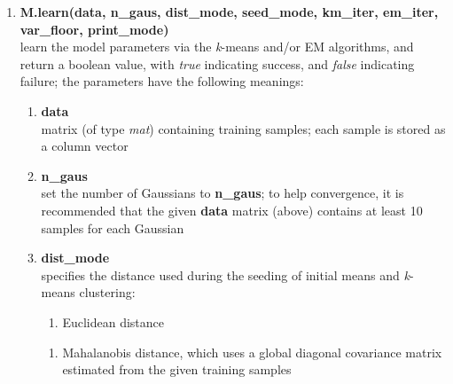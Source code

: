 \vspace{6ex}
\begin{enumerate}[{$\bullet$}]
\itemsep 1ex

\item
{\bf M.learn(data, n\_gaus, dist\_mode, seed\_mode, km\_iter, em\_iter, var\_floor, print\_mode)}\\
learn the model parameters via the {\it k}-means and/or EM algorithms,
and return a boolean value, with {\it true} indicating success, and {\it false} indicating failure;
the parameters have the following meanings:

\begin{small}
\begin{enumerate}[{-}]
\itemsep 0.5ex
\item
{\bf data}\\
matrix (of type {\it mat}) containing training samples; each sample is stored as a column vector

\item
{\bf n\_gaus}\\
set the number of Gaussians to {\bf n\_gaus};
to help convergence, it is recommended that the given {\bf data} matrix (above)
contains at least 10 samples for each Gaussian

\item
{\bf dist\_mode}\\
specifies the distance used during the seeding of initial means and \mbox{{\it k}-means} clustering:
\begin{small}
\begin{enumerate}
\item Euclidean distance
\end{enumerate}

\begin{enumerate}
\item Mahalanobis distance, which uses a global diagonal covariance matrix estimated from the given training samples
\end{enumerate}
\end{small}



\end{enumerate}
\end{small}
\end{enumerate}
